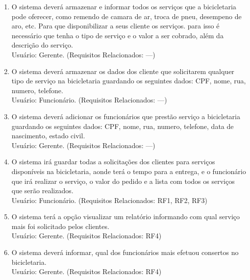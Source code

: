 \documentclass[
	12pt,				%
	openright,
	oneside,			%
	a4paper,			%
	chapter=TITLE,		%
	brazil				%
	]{abntex2}
\begin{document}
\begin{enumerate}[label=\bfseries RF\arabic*]

	\item O sistema deverá armazenar e informar todos os serviços que a bicicletaria pode oferecer, como remendo de camara de ar, troca de pneu, desempeno de aro, etc. Para que disponibilizar a seus cliente os serviços. para isso é necessário que tenha o tipo de serviço e o valor a ser cobrado, além da descrição do serviço.
\\Usuário: Gerente. (Requisitos Relacionados: ---) 

	\item O sistema deverá armazenar os dados dos cliente que solicitarem qualquer tipo de serviço na bicicletaria guardando os seguintes dados: CPF, nome, rua, numero, telefone.
\\Usuário: Funcionário. (Requisitos Relacionados: ---) 

	\item O sistema deverá adicionar os funcionários que prestão serviço a bicicletaria guardando os seguintes dados: CPF, nome, rua, numero, telefone, data de nascimento, estado civil.
\\Usuário: Gerente. (Requisitos Relacionados: ---) 


	\item O sistema irá guardar todas a solicitações dos clientes para serviços disponíveis na bicicletaria, aonde terá o tempo para a entrega, e o funcionário que irá realizar o serviço, o valor do pedido e a lista com todos os serviços que serão realizados. 
\\Usuário: Funcionário. (Requisitos Relacionados: RF1, RF2, RF3) 

	\item O sistema terá a opção visualizar um relatório informando com qual serviço mais foi solicitado pelos clientes.
\\Usuário: Gerente. (Requisitos Relacionados: RF4) 

	
	\item O sistema deverá informar, qual dos funcionários mais efetuou consertos no bicicletaria.  
\\Usuário: Gerente. (Requisitos Relacionados: RF4) 



\end{enumerate}
\end{document}
